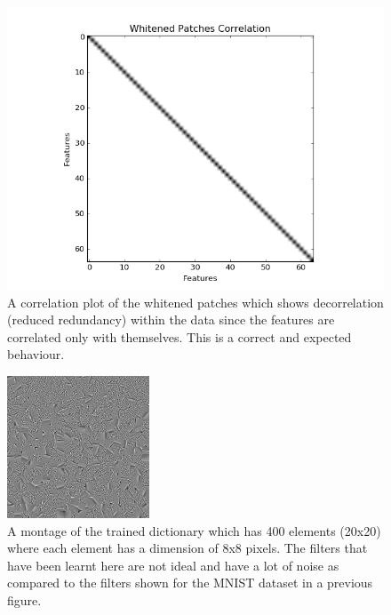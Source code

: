 \documentclass[	DIV=calc,%
				paper=a4,%
				fontsize=11pt,%
				twocolumn]{scrartcl}	 %
\begin{document}
\begin{figure}[H]
    \centering
    \includegraphics[width=0.9\linewidth]{data/sc_data/sc_atwork_whitened_patches_correlation.png}
    \caption{A correlation plot of the whitened patches which shows decorrelation (reduced redundancy) within the data since the features are correlated only with themselves. This is a correct and expected behaviour.}
    \label{sc_atwork_whitened_patches_correlation}
\end{figure}

\begin{figure}[H]
    \centering
    \includegraphics[width=0.65\linewidth]{data/sc_data/sc_atwork_dictionary.jpg}
    \caption{A montage of the trained dictionary which has 400 elements (20x20) where each element has a dimension of 8x8 pixels. The filters that have been learnt here are not ideal and have a lot of noise  as compared to the filters shown for the MNIST dataset in a previous figure.}
    \label{sc_atwork_dictionary}
\end{figure}
\end{document}
